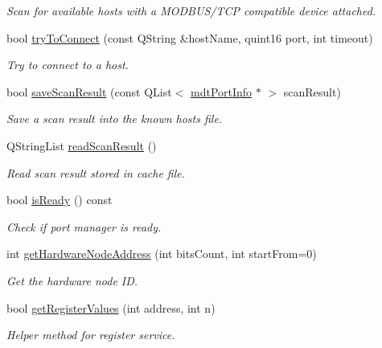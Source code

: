 \begin{DoxyCompactItemize}
\begin{DoxyCompactList}\small\item\em Scan for available hosts with a MODBUS/TCP compatible device attached. \end{DoxyCompactList}\item 
bool \hyperlink{classmdt_modbus_tcp_port_manager_ab04f69b660487a7c59d309df7a8f5baa}{tryToConnect} (const QString \&hostName, quint16 port, int timeout)
\begin{DoxyCompactList}\small\item\em Try to connect to a host. \end{DoxyCompactList}\item 
bool \hyperlink{classmdt_modbus_tcp_port_manager_a3a1f5a54c93fa90ba83dea8785407da3}{saveScanResult} (const QList$<$ \hyperlink{classmdt_port_info}{mdtPortInfo} $\ast$ $>$ scanResult)
\begin{DoxyCompactList}\small\item\em Save a scan result into the known hosts file. \end{DoxyCompactList}\item 
QStringList \hyperlink{classmdt_modbus_tcp_port_manager_ab4d0a994973af6008faf489ca9ddb03d}{readScanResult} ()
\begin{DoxyCompactList}\small\item\em Read scan result stored in cache file. \end{DoxyCompactList}\item 
bool \hyperlink{classmdt_modbus_tcp_port_manager_a5477eb7e8d57c5a42004046b426e39b6}{isReady} () const 
\begin{DoxyCompactList}\small\item\em Check if port manager is ready. \end{DoxyCompactList}\item 
int \hyperlink{classmdt_modbus_tcp_port_manager_a4f52a477c264f809984e25abbc856db8}{getHardwareNodeAddress} (int bitsCount, int startFrom=0)
\begin{DoxyCompactList}\small\item\em Get the hardware node ID. \end{DoxyCompactList}\item 
bool \hyperlink{classmdt_modbus_tcp_port_manager_ab5e780409492b5f56326a870bc4262ec}{getRegisterValues} (int address, int n)
\begin{DoxyCompactList}\small\item\em Helper method for register service. \end{DoxyCompactList}\item 

\end{DoxyCompactItemize}
